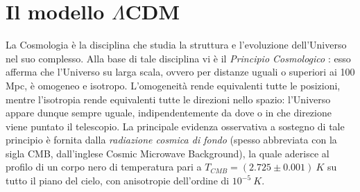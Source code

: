 \section{Il modello \texorpdfstring{$\Lambda$CDM}{LambdaCDM}}
La Cosmologia è la disciplina che studia la struttura e l'evoluzione dell'Universo nel suo complesso.
Alla base di tale disciplina vi è il \emph{Principio Cosmologico} \parencite{Ryden2003}: esso afferma che l'Universo su larga scala, ovvero per distanze uguali o superiori ai 100 Mpc, è omogeneo e isotropo.
L'omogeneità rende equivalenti tutte le posizioni, mentre l'isotropia rende equivalenti tutte le direzioni nello spazio: l'Universo appare dunque sempre uguale, indipendentemente da dove o in che direzione viene puntato il telescopio.
La principale evidenza osservativa a sostegno di tale principio è fornita dalla \emph{radiazione cosmica di fondo} (spesso abbreviata con la sigla CMB, dall'inglese Cosmic Microwave Background), la quale aderisce al profilo di un corpo nero di temperatura pari a $T_{CMB}=(2.725 \pm 0.001)\ K$ su tutto il piano del cielo, con anisotropie dell'ordine di $10^{-5}\ K$.

